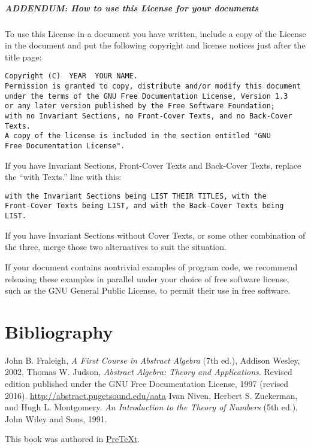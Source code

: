 \documentclass[10pt,]{book}
\theoremstyle{plain}
\theoremstyle{definition}
\theoremstyle{definition}
\theoremstyle{definition}
\theoremstyle{definition}
\numberwithin{equation}{section}
\begin{document}
\paragraph[{ADDENDUM: How to use this License for your documents}]{ADDENDUM: How to use this License for your documents}\hypertarget{gfdl-addendum}{}
To use this License in a document you have written, include a copy of the License in the document and put the following copyright and license notices just after the title page:%
\begin{verbatim}
Copyright (C)  YEAR  YOUR NAME.
Permission is granted to copy, distribute and/or modify this document
under the terms of the GNU Free Documentation License, Version 1.3
or any later version published by the Free Software Foundation;
with no Invariant Sections, no Front-Cover Texts, and no Back-Cover Texts.
A copy of the license is included in the section entitled "GNU
Free Documentation License".
\end{verbatim}
If you have Invariant Sections, Front-Cover Texts and Back-Cover Texts, replace the ``with\textellipsis{} Texts.'' line with this:%
\begin{verbatim}
with the Invariant Sections being LIST THEIR TITLES, with the
Front-Cover Texts being LIST, and with the Back-Cover Texts being LIST.
\end{verbatim}
If you have Invariant Sections without Cover Texts, or some other combination of the three, merge those two alternatives to suit the situation.%
\par
If your document contains nontrivial examples of program code, we recommend releasing these examples in parallel under your choice of free software license, such as the GNU General Public License, to permit their use in free software.%
%
\backmatter
%
\typeout{************************************************}
\typeout{************************************************}
\chapter[{Bibliography}]{Bibliography}\label{references-1}
\begin{referencelist}
\hypertarget{F}{}John B. Fraleigh, \textit{A First Course in Abstract Algebra} (7th ed.), Addison Wesley, 2002.
\hypertarget{J}{}Thomas W. Judson, \textit{Abstract Algebra: Theory and Applications}. Revised edition published under the GNU Free Documentation License, 1997 (revised 2016). \href{http://abstract.pugetsound.edu/aata}{http://abstract.pugetsound.edu/aata}
\hypertarget{NZM}{}Ivan Niven, Herbert S. Zuckerman, and Hugh L. Montgomery. \textit{An Introduction to the Theory of Numbers} (5th ed.), John Wiley and Sons, 1991.
\end{referencelist}
\cleardoublepage
\pagestyle{empty}
\centerline{This book was authored in \href{http://mathbook.pugetsound.edu}{PreTeXt}.%
}
\end{document}
